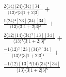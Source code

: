 \documentclass[varwidth, border=5pt]{standalone}
\begin{document}
\begin{my}
$\begin{gathered}
\scriptscriptstyle\frac{2⟨14⟩⟨24⟩⟨34⟩[34]}{⟨13⟩²⟨3|1+2|3]} +\\
\scriptscriptstyle\frac{1⟨24⟩²[23]⟨34⟩[34]}{⟨13⟩⟨3|1+2|3]²} +\\
\scriptscriptstyle\frac{2⟨12⟩⟨14⟩⟨34⟩²[13][34]}{⟨13⟩²⟨3|1+2|3]²} +\\
\scriptscriptstyle\frac{-1⟨12⟩²[23]⟨34⟩³[34]}{⟨13⟩³⟨3|1+2|3]²} +\\
\scriptscriptstyle\frac{-1⟨12⟩[13]²⟨14⟩⟨34⟩²[34]}{⟨13⟩⟨3|1+2|3]³} \phantom{+}
\end{gathered}$
\end{my}
\end{document}
